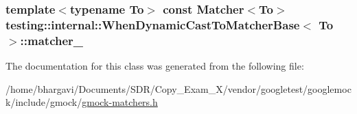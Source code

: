\subsubsection[{\texorpdfstring{matcher\+\_\+}{matcher_}}]{\setlength{\rightskip}{0pt plus 5cm}template$<$typename To$>$ const {\bf Matcher}$<${\bf To}$>$ {\bf testing\+::internal\+::\+When\+Dynamic\+Cast\+To\+Matcher\+Base}$<$ {\bf To} $>$\+::matcher\+\_\+\hspace{0.3cm}{\ttfamily [protected]}}\hypertarget{classtesting_1_1internal_1_1_when_dynamic_cast_to_matcher_base_a40d697407c960bee8fe3b125f5ac8730}{}\label{classtesting_1_1internal_1_1_when_dynamic_cast_to_matcher_base_a40d697407c960bee8fe3b125f5ac8730}


The documentation for this class was generated from the following file\+:\begin{DoxyCompactItemize}
\item 
/home/bhargavi/\+Documents/\+S\+D\+R/\+Copy\+\_\+\+Exam\+\_\+X/vendor/googletest/googlemock/include/gmock/\hyperlink{gmock-matchers_8h}{gmock-\/matchers.\+h}\end{DoxyCompactItemize}
